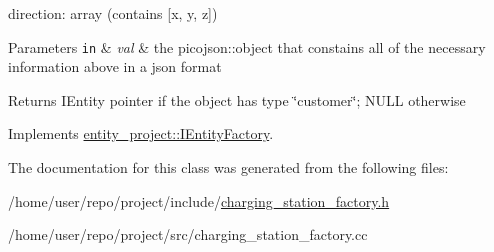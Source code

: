 direction\+: array (contains \mbox{[}x, y, z\mbox{]})


\begin{DoxyParams}[1]{Parameters}
\mbox{\tt in}  & {\em val} & the picojson\+::object that constains all of the necessary information above in a json format \\
\hline
\end{DoxyParams}
\begin{DoxyReturn}{Returns}
I\+Entity pointer if the object has type \char`\"{}customer\char`\"{}; N\+U\+LL otherwise 
\end{DoxyReturn}


Implements \hyperlink{classentity__project_1_1IEntityFactory_ac4e8eaf4294958fef0b98bd3684704bb}{entity\+\_\+project\+::\+I\+Entity\+Factory}.



The documentation for this class was generated from the following files\+:\begin{DoxyCompactItemize}
\item 
/home/user/repo/project/include/\hyperlink{charging__station__factory_8h}{charging\+\_\+station\+\_\+factory.\+h}\item 
/home/user/repo/project/src/charging\+\_\+station\+\_\+factory.\+cc\end{DoxyCompactItemize}
